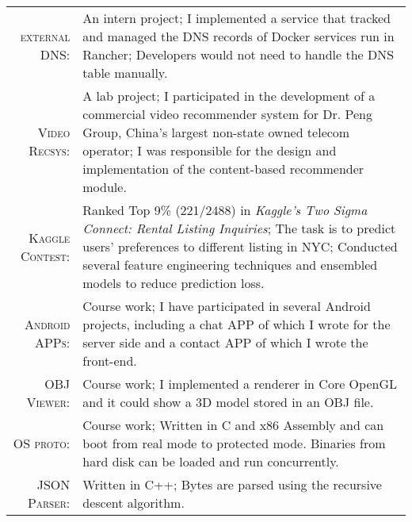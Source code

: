 \documentclass[a4paper,10pt]{article} %
\begin{document}
\begin{tabular}{rp{11cm}}
	
	\textsc{external DNS:} & An intern project; I implemented a service that tracked and managed the DNS records of Docker services run in Rancher; Developers would not need to handle the DNS table manually.
	
	\\
	
	\textsc{Video Recsys:} & A lab project; I participated in the development of a commercial  video recommender system for Dr. Peng Group, China's largest non-state owned telecom operator; I was responsible for the design and implementation of the content-based recommender module.
	
	\\
	
	
	\textsc{Kaggle Contest:} & Ranked Top 9\% (221/2488) in \textit{Kaggle's Two Sigma Connect: Rental Listing Inquiries}; The task is to predict users' preferences to different listing in NYC;  Conducted several feature engineering techniques and ensembled models to reduce prediction loss.
	
	\\
	
	
	\textsc{Android APPs:} & Course work; I have participated in several Android projects, including a chat APP of which I wrote for the server side and a contact APP of which I wrote the front-end.
	
	\\
	
	\textsc{OBJ Viewer:}  & Course work; I implemented a renderer in Core OpenGL and it could show a 3D model stored in an  OBJ file. 
	
	\\
	
	\textsc{OS proto:} & Course work; Written in C and x86 Assembly and can boot from real mode to protected  mode. Binaries from hard disk can be loaded and run concurrently.
	
	\\
	
	\textsc{JSON Parser:} & Written in C++; Bytes are parsed using the recursive descent algorithm.
	
	
	
\end{tabular}
\end{document}
